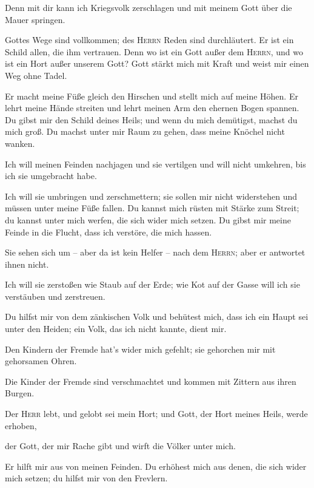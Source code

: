  Denn mit dir kann ich Kriegsvolk zerschlagen und mit
meinem Gott über die Mauer springen.

 Gottes Wege sind vollkommen; des \textsc{Herrn} Reden
sind durchläutert. Er ist ein Schild allen, die ihm vertrauen.
 Denn wo ist ein Gott außer dem \textsc{Herrn}, und wo
ist ein Hort außer unserem Gott?  Gott stärkt mich mit
Kraft und weist mir einen Weg ohne Tadel.

 Er macht meine Füße gleich den Hirschen und stellt mich
auf meine Höhen.  Er lehrt meine Hände streiten und lehrt
meinen Arm den ehernen Bogen spannen.  Du gibst mir den
Schild deines Heils; und wenn du mich demütigst, machst du mich groß.
 Du machst unter mir Raum zu gehen, dass meine Knöchel
nicht wanken.

 Ich will meinen Feinden nachjagen und sie vertilgen und
will nicht umkehren, bis ich sie umgebracht habe.

 Ich will sie umbringen und zerschmettern; sie sollen mir
nicht widerstehen und müssen unter meine Füße fallen.  Du
kannst mich rüsten mit Stärke zum Streit; du kannst unter mich werfen,
die sich wider mich setzen.  Du gibst mir meine Feinde in
die Flucht, dass ich verstöre, die mich hassen.

 Sie sehen sich um -- aber da ist kein Helfer -- nach dem
\textsc{Herrn}; aber er antwortet ihnen nicht.

 Ich will sie zerstoßen wie Staub auf der Erde; wie Kot
auf der Gasse will ich sie verstäuben und zerstreuen.

 Du hilfst mir von dem zänkischen Volk und behütest mich,
dass ich ein Haupt sei unter den Heiden; ein Volk, das ich nicht kannte,
dient mir.

 Den Kindern der Fremde hat's wider mich gefehlt; sie
gehorchen mir mit gehorsamen Ohren.

 Die Kinder der Fremde sind verschmachtet und kommen mit
Zittern aus ihren Burgen.

 Der \textsc{Herr} lebt, und gelobt sei mein Hort; und
Gott, der Hort meines Heils, werde erhoben,

 der Gott, der mir Rache gibt und wirft die Völker unter
mich.

 Er hilft mir aus von meinen Feinden. Du erhöhest mich
aus denen, die sich wider mich setzen; du hilfst mir von den Frevlern.


